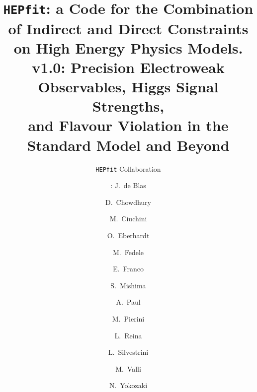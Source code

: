 \documentclass[preprint,3p,12pt]{elsarticle}
\newcommand{\HEPfit}{\texttt{HEPfit}\xspace}
\begin{document}
\begin{frontmatter}



\title{\HEPfit: a Code for the Combination of Indirect and Direct
  Constraints\\ on High Energy Physics Models. \\
  v1.0: Precision Electroweak Observables, Higgs Signal Strengths,\\ and Flavour Violation in the
  Standard Model and Beyond}

\author[]{\HEPfit Collaboration }
\author[a]{\hspace*{-8pt}\colorbox{white}{}\hspace*{-4pt}: J.~de Blas}
\author[a]{D.~Chowdhury}
\author[b]{M.~Ciuchini}
\author[a]{O.~Eberhardt}
\author[a]{M.~Fedele}
\author[a]{E.~Franco}
\author[c]{S.~Mishima}
\author[a]{A.~Paul}
\author[d]{M.~Pierini}
\author[e]{L.~Reina}
\author[a]{L.~Silvestrini}
\author[f]{M.~Valli}
\author[g]{N.~Yokozaki}

\address[a]{INFN, Sezione di Roma, Piazzale A. Moro 2, I-00185 Roma, Italy}
\address[b]{INFN,  Sezione di Roma Tre, Via della Vasca Navale 84, I-00146 Roma, Italy}
\address[c]{Institute of Particle and Nuclear Studies, KEK, Tsukuba 305-0801, Japan}
\address[d]{CERN}
\address[e]{Physics Department, Florida State University, Tallahassee, FL 32306-4350, USA}
\address[f]{SISSA, via Bonomea 265, I-34136 Trieste, Italy and INFN, Sezione di Trieste, via Valerio 2, I-34127 Trieste, Italy}
\address[g]{Department of Physics, Tohoku University, Sendai, Miyagi 980-8578, Japan}



\end{frontmatter}
\end{document}
